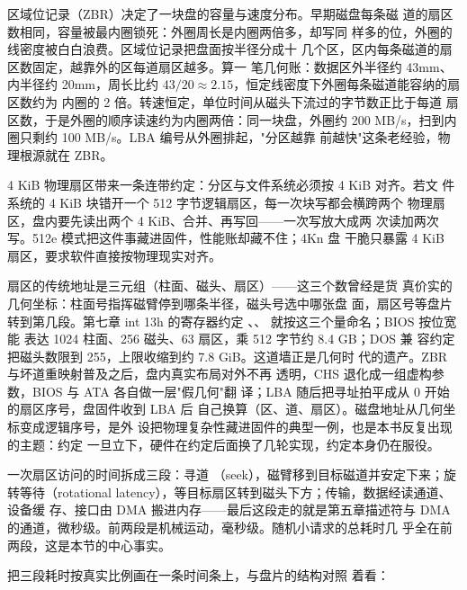 区域位记录（ZBR）决定了一块盘的容量与速度分布。早期磁盘每条磁
道的扇区数相同，容量被最内圈锁死：外圈周长是内圈两倍多，却写同
样多的位，外圈的线密度被白白浪费。区域位记录把盘面按半径分成十
几个区，区内每条磁道的扇区数固定，越靠外的区每道扇区越多。算一
笔几何账：数据区外半径约 43mm、内半径约 20mm，周长比约
$43/20\approx2.15$，恒定线密度下外圈每条磁道能容纳的扇区数约为
内圈的 2 倍。转速恒定，单位时间从磁头下流过的字节数正比于每道
扇区数，于是外圈的顺序读速约为内圈两倍：同一块盘，外圈约
200 MB/s，扫到内圈只剩约 100 MB/s。LBA 编号从外圈排起，"分区越靠
前越快"这条老经验，物理根源就在 ZBR。

4 KiB 物理扇区带来一条连带约定：分区与文件系统必须按 4 KiB 对齐。若文
件系统的 4 KiB 块错开一个 512 字节逻辑扇区，每一次块写都会横跨两个
物理扇区，盘内要先读出两个 4 KiB、合并、再写回——一次写放大成两
次读加两次写。512e 模式把这件事藏进固件，性能账却藏不住；4Kn 盘
干脆只暴露 4 KiB 扇区，要求软件直接按物理现实对齐。

扇区的传统地址是三元组（柱面、磁头、扇区）——这三个数曾经是货
真价实的几何坐标：柱面号指挥磁臂停到哪条半径，磁头号选中哪张盘
面，扇区号等盘片转到第几段。第七章 int 13h 的寄存器约定
、、 就按这三个量命名；BIOS 按位宽能
表达 1024 柱面、256 磁头、63 扇区，乘 512 字节约 8.4 GB；DOS 兼
容约定把磁头数限到 255，上限收缩到约 7.8 GiB。这道墙正是几何时
代的遗产。ZBR 与坏道重映射普及之后，盘内真实布局对外不再
透明，CHS 退化成一组虚构参数，BIOS 与 ATA 各自做一层"假几何"翻
译；LBA 随后把寻址拍平成从 0 开始的扇区序号，盘固件收到 LBA 后
自己换算（区、道、扇区）。磁盘地址从几何坐标变成逻辑序号，是外
设把物理复杂性藏进固件的典型一例，也是本书反复出现的主题：约定
一旦立下，硬件在约定后面换了几轮实现，约定本身仍在服役。

一次扇区访问的时间拆成三段：寻道
（seek），磁臂移到目标磁道并安定下来；旋转等待（rotational
latency），等目标扇区转到磁头下方；传输，数据经读通道、设备缓
存、接口由 DMA 搬进内存——最后这段走的就是第五章描述符与 DMA
的通道，微秒级。前两段是机械运动，毫秒级。随机小请求的总耗时几
乎全在前两段，这是本节的中心事实。

把三段耗时按真实比例画在一条时间条上，与盘片的结构对照
着看：

